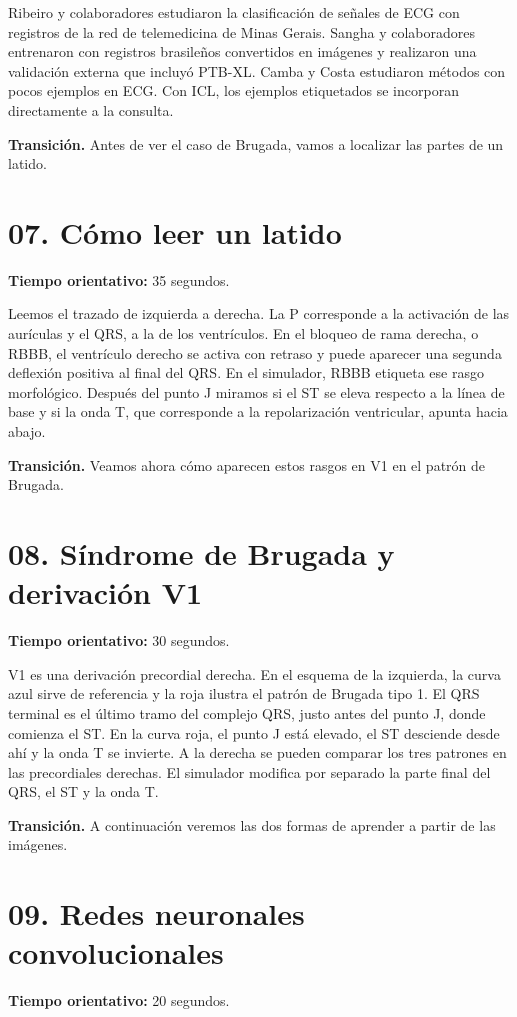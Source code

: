 \documentclass[11pt,a4paper]{article}
\begin{document}
Ribeiro y colaboradores estudiaron la clasificación de señales de ECG con registros de la red de telemedicina de Minas Gerais. Sangha y colaboradores entrenaron con registros brasileños convertidos en imágenes y realizaron una validación externa que incluyó PTB-XL. Camba y Costa estudiaron métodos con pocos ejemplos en ECG. Con ICL, los ejemplos etiquetados se incorporan directamente a la consulta.

\textbf{Transición.} Antes de ver el caso de Brugada, vamos a localizar las partes de un latido.

\section*{07. Cómo leer un latido}
\textbf{Tiempo orientativo: }35 segundos.

Leemos el trazado de izquierda a derecha. La P corresponde a la activación de las aurículas y el QRS, a la de los ventrículos. En el bloqueo de rama derecha, o RBBB, el ventrículo derecho se activa con retraso y puede aparecer una segunda deflexión positiva al final del QRS. En el simulador, RBBB etiqueta ese rasgo morfológico. Después del punto J miramos si el ST se eleva respecto a la línea de base y si la onda T, que corresponde a la repolarización ventricular, apunta hacia abajo.

\textbf{Transición.} Veamos ahora cómo aparecen estos rasgos en V1 en el patrón de Brugada.

\section*{08. Síndrome de Brugada y derivación V1}
\textbf{Tiempo orientativo: }30 segundos.

V1 es una derivación precordial derecha. En el esquema de la izquierda, la curva azul sirve de referencia y la roja ilustra el patrón de Brugada tipo 1. El QRS terminal es el último tramo del complejo QRS, justo antes del punto J, donde comienza el ST. En la curva roja, el punto J está elevado, el ST desciende desde ahí y la onda T se invierte. A la derecha se pueden comparar los tres patrones en las precordiales derechas. El simulador modifica por separado la parte final del QRS, el ST y la onda T.

\textbf{Transición.} A continuación veremos las dos formas de aprender a partir de las imágenes.

\section*{09. Redes neuronales convolucionales}
\textbf{Tiempo orientativo: }20 segundos.
\end{document}
